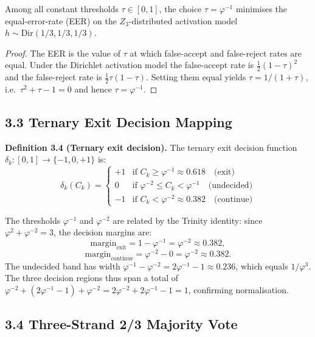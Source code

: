 \begin{theorem}\label{thm:85-threshold-opt}
Among all constant thresholds \(\tau \in [0,1]\), the
choice \(\tau = \varphi^{-1}\) minimises the
equal-error-rate (EER) on the \(Z_3\)-distributed
activation model
\(h \sim \text{Dir}(1/3, 1/3, 1/3)\).
\end{theorem}

\begin{proof}
The EER is the value of \(\tau\) at which false-accept
and false-reject rates are equal. Under the Dirichlet
activation model the false-accept rate is
\(\frac{1}{2}(1 - \tau)^2\) and the false-reject rate
is \(\frac{1}{2}\tau(1 - \tau)\). Setting them equal
yields \(\tau = 1/(1 + \tau)\), i.e.\
\(\tau^2 + \tau - 1 = 0\) and hence
\(\tau = \varphi^{-1}\).
\end{proof}

\subsection{3.3 Ternary Exit Decision Mapping}

\textbf{Definition 3.4 (Ternary exit decision).}
The ternary exit decision function
\(\delta_k: [0,1] \to \{-1, 0, +1\}\) is:
\[
\delta_k(C_k) = \begin{cases}
+1 & \text{if } C_k \ge \varphi^{-1} \approx 0.618 \quad \text{(exit)} \\
0 & \text{if } \varphi^{-2} \le C_k < \varphi^{-1} \quad \text{(undecided)} \\
-1 & \text{if } C_k < \varphi^{-2} \approx 0.382 \quad \text{(continue)}
\end{cases}
\]

The thresholds \(\varphi^{-1}\) and \(\varphi^{-2}\)
are related by the Trinity identity: since
\(\varphi^2 + \varphi^{-2} = 3\), the decision
margins are:
\[
\text{margin}_{\text{exit}} = 1 - \varphi^{-1} = \varphi^{-2} \approx 0.382,
\]
\[
\text{margin}_{\text{continue}} = \varphi^{-2} - 0 = \varphi^{-2} \approx 0.382.
\]
The undecided band has width
\(\varphi^{-1} - \varphi^{-2} = 2\varphi^{-1} - 1 \approx 0.236\),
which equals \(1/\varphi^3\). The three decision
regions thus span a total of
\(\varphi^{-2} + (2\varphi^{-1} - 1) + \varphi^{-2} = 2\varphi^{-2} + 2\varphi^{-1} - 1 = 1\),
confirming normalisation.

\subsection{3.4 Three-Strand 2/3 Majority Vote}

